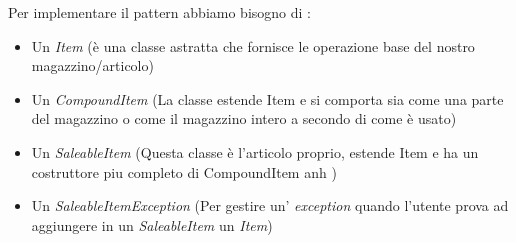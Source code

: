 \documentclass[12pt]{article}
\begin{document}
Per implementare il pattern abbiamo bisogno di :
\begin{itemize}
    \item Un \textit{Item} (è una classe astratta che fornisce le operazione base del nostro magazzino/articolo)
    \item Un \textit{CompoundItem} (La classe estende Item e si comporta sia come una parte del magazzino o come il magazzino intero a secondo di come è usato)
    \item Un \textit{SaleableItem} (Questa classe è l'articolo proprio, estende Item e ha un costruttore piu completo di CompoundItem anh )
    \item Un  \textit{SaleableItemException} (Per gestire un' \textit{exception} quando l'utente prova ad aggiungere in un \textit{SaleableItem} un \textit{Item})
\end{itemize}
\end{document}
